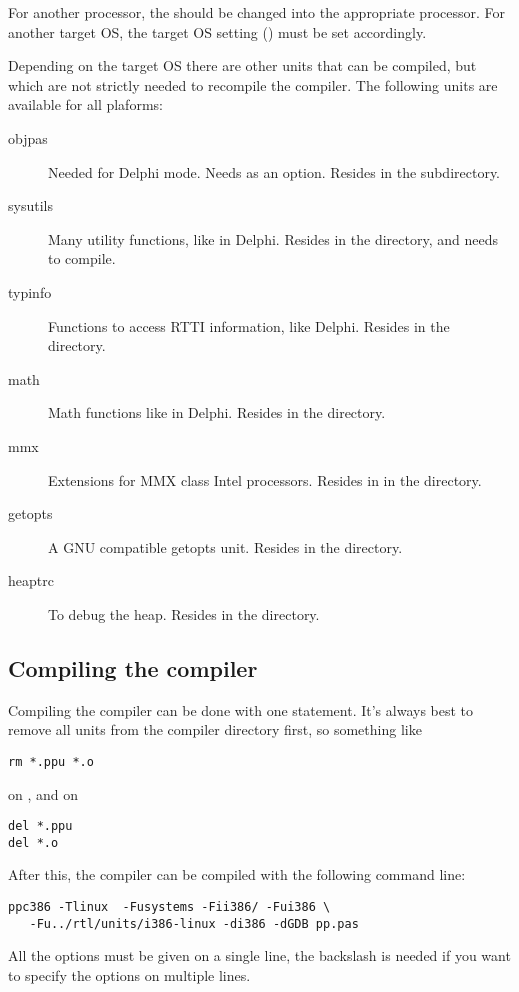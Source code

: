 For another processor, the  should be changed into the appropriate
processor. For another target OS, the target OS setting () must be 
set accordingly.

Depending on the target OS there are other units that can be 
compiled, but which are not strictly needed to recompile the compiler.
The following units are available for all plaforms:
\begin{description}
\item[objpas] Needed for Delphi mode. Needs  as an option. Resides
in the  subdirectory.
\item[sysutils] Many utility functions, like in Delphi. Resides in the
 directory, and needs  to compile.
\item[typinfo] Functions to access RTTI information, like Delphi. Resides in
the  directory.
\item[math] Math functions like in Delphi. Resides in the 
directory.
\item[mmx] Extensions for MMX class Intel processors. Resides in
in the  directory.
\item[getopts] A GNU compatible getopts unit. Resides in the 
directory.
\item[heaptrc] To debug the heap. Resides in the  directory.
\end{description}

\subsection{Compiling the compiler}

Compiling the compiler can be done with one statement. It's always best to
remove all units from the compiler directory first, so something like
\begin{verbatim}
rm *.ppu *.o
\end{verbatim}
on \linux, and on \dos
\begin{verbatim}
del *.ppu
del *.o
\end{verbatim}
After this, the compiler can be compiled with the following command line:
\begin{verbatim}
ppc386 -Tlinux  -Fusystems -Fii386/ -Fui386 \
   -Fu../rtl/units/i386-linux -di386 -dGDB pp.pas
\end{verbatim}
All the options must be given on a single line, the backslash is needed if
you want to specify the options on multiple lines.

